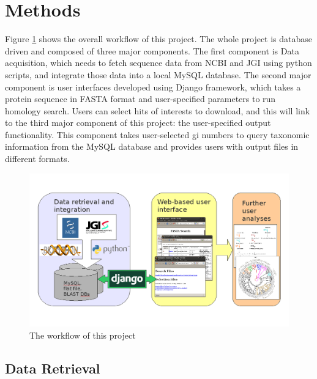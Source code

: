 \documentclass[11pt,letterpaper,twoside,english]{article}
\begin{document}
\section{Methods}

Figure \ref{fig:The-workflow-of} shows the overall workflow of this
project. The whole project is database driven and composed of three
major components. The first component is Data acquisition, which needs
to fetch sequence data from NCBI and JGI using python scripts, and
integrate those data into a local MySQL database. The second major
component is user interfaces developed using Django framework, which
takes a protein sequence in FASTA format and user-specified parameters
to run homology search. Users can select hits of interests to download,
and this will link to the third major component of this project: the
user-specified output functionality. This component takes user-selected
gi numbers to query taxonomic information from the MySQL database
and provides users with output files in different formats.

\begin{figure}[tbph]
\begin{centering}
\includegraphics[width=0.95\linewidth]{figures/workflow.png}
\par\end{centering}

\caption{\label{fig:The-workflow-of}The workflow of this project}

\end{figure}


\subsection{\label{sub:Data-Retrieval}Data Retrieval}

\end{document}

